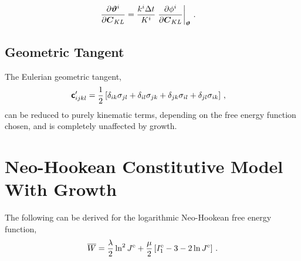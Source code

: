\documentclass[10pt,letterpaper,oneside]{report}
\newcommand{\ten}[1]{\mbox{\boldmath $#1$}{}}
\newcommand{\tenf}[1]{\mbox{{\sffamily{\bfseries {#1}}}}}
\newcommand{\scas}[1]{\mbox{{\scriptsize{${\rm{#1}}$}}}{}}
\newcommand{\tens}[1]{\mbox{\boldmath{\scriptsize{$#1$}}}{}}
\begin{document}
\begin{align}
\frac{\partial \ten{\vartheta}^i }{\partial \ten{C}_{KL} } 
={}& \frac{k^i \Delta t}{K^i} \left. \frac{\partial \phi^i }{\partial \ten{C}_{KL} } \right|_{\tens{\vartheta} } \, . 
\end{align}


\subsection{Geometric Tangent}
The Eulerian geometric tangent, 
\begin{align}
\tenf{c}'_{ijkl} ={}& \frac{1}{2} \left[ \delta_{ik}\sigma_{jl} + \delta_{il}\sigma_{jk} + \delta_{jk}\sigma_{il} + \delta_{jl}\sigma_{ik} \right] \, , 
\end{align}
can be reduced to purely kinematic terms, depending on the free energy function chosen, and is completely unaffected by growth.


\newpage
\section{Neo-Hookean Constitutive Model With Growth}
The following can be derived for the logarithmic Neo-Hookean free energy function, 
\begin{equation}
\overline{W} = \frac{\lambda}{2} \ln^2 J^{\scas{e}} + \frac{\mu}{2} \left[ I_1^{\scas{e}} - 3 - 2 \ln J^{\scas{e}} \right] \, . 
\label{neohooke}
\end{equation}
\end{document}

